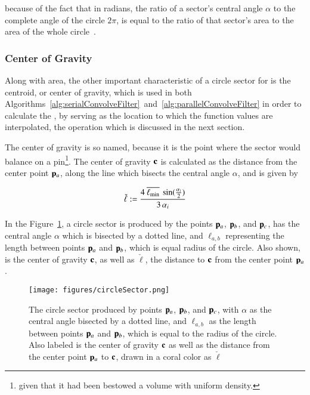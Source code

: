 because of the fact that in radians, the ratio of a sector's central angle $\alpha$ to the complete angle of the circle $2\pi$, is equal to the ratio of that sector's area to the area of the whole circle~\cite{Weisstein19d}.%
%

%
%
\subsubsection{Center of Gravity}
\label{ch2sEBTssGsssCG}
Along with area, the other important characteristic of a circle sector for  is the centroid, or center of gravity, which is used in both Algorithms~\ref{alg:serialConvolveFilter}~and~\ref{alg:parallelConvolveFilter} in order to calculate the , by serving as the location to which the function values are interpolated, the operation which is discussed in the next section.

The center of gravity is so named, because it is the point where the sector would balance on a pin\footnote{given that it had been bestowed a volume with uniform density.}. The center of gravity $\mathbf{c}$ is calculated as the distance from the center point $\mathbf{p}_a$, along the line which bisects the central angle $\alpha$, and is given by

\begin{equation}
	\check{\ell} := \frac{4\:\overline{\ell_\text{min}}\:\sin(\frac{\alpha_i}{2})}{3\,\alpha_i}
	\label{eq:ch2distToCoG}
\end{equation}%
%
%

In the Figure~\ref{fig:circleSector}, a circle sector is produced by the points $\mathbf{p}_a$, $\mathbf{p}_b$, and $\mathbf{p}_c$, has the central angle $\alpha$ which is bisected by a dotted line, and $\ell_{a,b}$ representing the length between points $\mathbf{p}_a$ and $\mathbf{p}_b$, which is equal radius of the circle. Also shown, is the center of gravity $\mathbf{c}$, as well as $\check{\ell}$, the distance to $\mathbf{c}$ from the center point $\mathbf{p}_a$.

\begin{figure}[ht]
\ffigbox
	{\texttt{[image: figures/circleSector.png]}}
	{\caption[A Circle Sector in Detail]{The circle sector produced by points $\mathbf{p}_a$, $\mathbf{p}_b$, and $\mathbf{p}_c$, with $\alpha$ as the central angle bisected by a dotted line, and $\ell_{a,b}$ as the length between points $\mathbf{p}_a$ and $\mathbf{p}_b$, which is equal to the radius of the circle. Also labeled is the center of gravity $\mathbf{c}$ as well as the distance from the center point $\mathbf{p}_a$ to $\mathbf{c}$, drawn in a coral color as $\check{\ell}$}\label{fig:circleSector}}
\end{figure}

